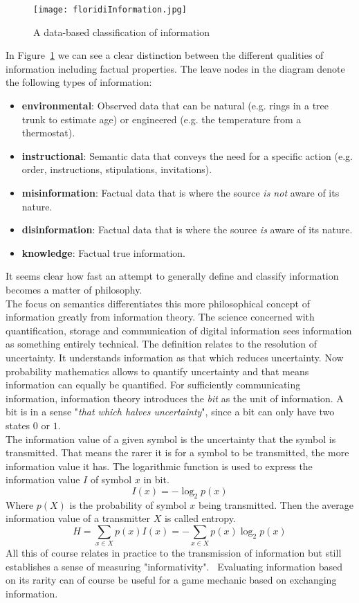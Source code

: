 \begin{figure}
	\centering
	\texttt{[image: floridiInformation.jpg]}
	\caption{A data-based classification of information~\cite{Floridi2009}}
	\label{fig:floridiInformation}
\end{figure}
In Figure~\ref{fig:floridiInformation} we can see a clear distinction between the different qualities of information including factual properties. The leave nodes in the diagram denote the following types of information:
\begin{itemize}
	\item \textbf{environmental}: Observed data that can be natural (e.g. rings in a tree trunk to estimate age) or engineered (e.g. the temperature from a thermostat).
	\item \textbf{instructional}: Semantic data that conveys the need for a specific action (e.g. order, instructions, stipulations, invitations).
	\item \textbf{misinformation}: Factual data that is where the source \textit{is not} aware of its nature.
	\item \textbf{disinformation}: Factual data that is where the source \textit{is} aware of its nature.
	\item \textbf{knowledge}: Factual true information.
\end{itemize}
It seems clear how fast an attempt to generally define and classify information becomes a matter of philosophy.~\cite{Floridi2009}\\
The focus on semantics differentiates this more philosophical concept of information greatly from information theory. The science concerned with quantification, storage and communication of digital information sees information as something entirely technical. The definition relates to the resolution of uncertainty. It understands information as that which reduces uncertainty. Now probability mathematics allows to quantify uncertainty and that means information can equally be quantified. For sufficiently communicating information, information theory introduces the \textit{bit} as the unit of information. A bit is in a sense "\textit{that which halves uncertainty}", since a bit can only have two states $0$ or $1$.~\cite{Shannon1948}\\
The information value of a given symbol is the uncertainty that the symbol is transmitted. That means the rarer it is for a symbol to be transmitted, the more information value it has. The logarithmic function is used to express the information value $I$ of symbol $x$ in bit.
\begin{equation}
	I(x) = -\log_2 p(x)
\end{equation}
Where $p(X)$ is the probability of symbol $x$ being transmitted. Then the average information value of a transmitter $X$ is called entropy.
\begin{equation}
	H = \sum_{x \in X} p(x)I(x) = -\sum_{x \in X} p(x)\log_2 p(x)
\end{equation}
All this of course relates in practice to the transmission of information but still establishes a sense of measuring "informativity".~\cite{Shannon1949} Evaluating information based on its rarity can of course be useful for a game mechanic based on exchanging information.
